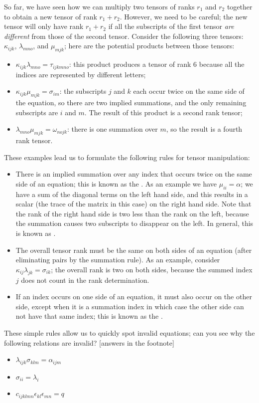 So far, we have seen how we can multiply two tensors of ranks $r_1$ and $r_2$ together to obtain a new tensor of rank $r_1+r_2$.  However, we need to be careful; the new tensor will only have rank $r_1+r_2$ if all the subscripts of the first tensor \textit{are different} from those of the second tensor.  Consider the following three tensors: $\kappa_{ijk}$, $\lambda_{mno}$, and $\mu_{mjk}$; here are the potential products between those tensors:
\begin{itemize}
\item $\kappa_{ijk}\lambda_{mno} = \tau_{ijkmno}$: this product produces a tensor of rank $6$ because all the indices are represented by different letters;
\item $\kappa_{ijk}\mu_{mjk} = \sigma_{im}$: the subscripts $j$ and $k$ each occur twice on the same side of the equation, so there are two implied summations, and the only remaining subscripts are $i$ and $m$.  The result of this product is a second rank tensor;
\item $\lambda_{mno}\mu_{mjk}=\omega_{nojk}$: there is one summation over $m$, so the result is a fourth rank tensor.
\end{itemize}

\noindent These examples lead us to formulate the following rules for tensor manipulation:
\begin{itemize}
	\item There is an implied summation over any index that occurs twice on the same side of an equation; this is known as the .  As an example we have $\mu_{ii}=\alpha$; we have a sum of the diagonal terms on the left hand side, and this results in a scalar (the trace of the matrix in this case) on the right hand side.  Note that the rank of the right hand side is two less than the rank on the left, because the summation causes two subscripts to disappear on the left.  In general, this is known as .
	\item The overall tensor rank must be the same on both sides of an equation (after eliminating pairs by the summation rule).  As an example, consider $\kappa_{ij}\lambda_{jk}=\sigma_{ik}$; the overall rank is two on both sides, because the summed index $j$ does not count in the rank determination.
	\item If an index occurs on one side of an equation, it must also occur on the other side, except when it is a summation index in which case the other side can not have that same index; this is known as the .
\end{itemize}
These simple rules allow us to quickly spot invalid equations; can you see why the following relations are invalid? [answers in the footnote\footnotemark{}]
\begin{itemize}
\item[(1)] $\lambda_{ijk}\sigma_{klm} = \alpha_{ijm}$
\item[(2)] $\sigma_{ii} = \lambda_i$ 
\item[(3)] $c_{ijklmn}\epsilon_{kl}\epsilon_{mn} = q$
\end{itemize}

